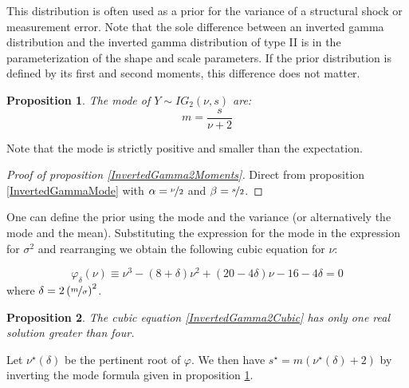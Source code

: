 \documentclass{amsart}
\theoremstyle{plain}
\newtheorem{proposition}{Proposition}[section]
\theoremstyle{remark}
\numberwithin{equation}{section}
\begin{document}
This distribution is often used as a prior for the variance of a structural shock
or measurement error. Note that the sole difference between an inverted gamma
distribution and the inverted gamma distribution of type II is in the parameterization of the
shape and scale parameters. If the prior distribution is defined by its first and
second moments, this difference does not matter.\newline

\begin{proposition}\label{InvertedGamma2Mode}
  The mode of $Y\sim IG_2(\nu, s)$ are:
  \[
    m = \frac{s}{\nu+2}
  \]
\end{proposition}

Note that the mode is strictly positive and smaller than the expectation.

\begin{proof}[Proof of proposition \ref{InvertedGamma2Moments}]
  Direct from proposition \ref{InvertedGammaMode} with $\alpha=\nicefrac{\nu}{2}$ and $\beta=\nicefrac{s}{2}$.
\end{proof}

One can define the prior using the mode and the variance (or alternatively the
mode and the mean). Substituting the expression for the mode in the expression
for $\sigma^2$ and rearranging we obtain the following cubic equation for $\nu$:

\begin{equation}\label{InvertedGamma2Cubic}
\varphi_{\delta}(\nu) \equiv \nu^3 - (8+\delta)\nu^2 + (20-4\delta)\nu - 16 -4\delta = 0
\end{equation}
where $\delta = 2\left(\nicefrac{m}{\sigma}\right)^2$.

\begin{proposition}\label{InvertedGamma2SolveCubic}
  The cubic equation \eqref{InvertedGamma2Cubic} has only one real solution greater than four.
\end{proposition}

Let $\nu^{\star}(\delta)$ be the pertinent root of $\varphi$. We then have $s^{\star} = m(\nu^{\star}(\delta)+2)$ by inverting
the mode formula given in proposition \ref{InvertedGamma2Mode}.
\end{document}
